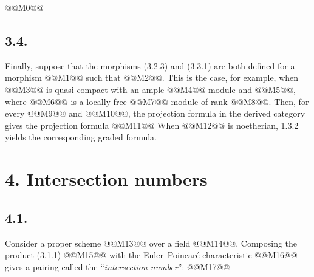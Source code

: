 
@@M0@@

\subsection*{3.4.}
Finally, suppose that the morphisms (3.2.3) and (3.3.1) are both defined for a morphism @@M1@@ such that @@M2@@. This is the case, for example, when @@M3@@ is quasi-compact with an ample @@M4@@-module and @@M5@@, where @@M6@@ is a locally free @@M7@@-module of rank @@M8@@. Then, for every @@M9@@ and @@M10@@, the projection formula in the derived category gives the projection formula
@@M11@@
When @@M12@@ is noetherian, 1.3.2 yields the corresponding graded formula.

\section*{4. Intersection numbers}

\subsection*{4.1.}
Consider a proper scheme @@M13@@ over a field @@M14@@. Composing the product (3.1.1)
@@M15@@
with the Euler--Poincaré characteristic
@@M16@@
gives a pairing called the ``\emph{intersection number}'':
@@M17@@

